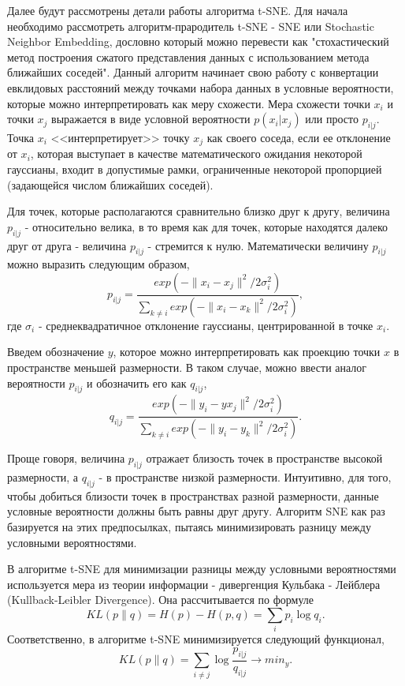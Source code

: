 \documentclass[runningheads]{llncs}
\begin{document}
Далее будут рассмотрены детали работы алгоритма t-SNE. Для начала необходимо рассмотреть алгоритм-прародитель t-SNE - SNE или Stochastic Neighbor Embedding, дословно который можно перевести как "стохастический метод построения сжатого представления данных с использованием метода ближайших соседей". Данный алгоритм начинает свою работу с конвертации евклидовых расстояний между точками набора данных в условные вероятности, которые можно интерпретировать как меру схожести. Мера схожести точки $x_i$ и точки $x_j$ выражается в виде условной вероятности $p(x_i | x_j)$ или просто $p_{i|j}$. Точка $x_i$ <<интерпретирует>> точку $x_j$ как своего соседа, если ее отклонение от $x_i$, которая выступает в качестве математического ожидания некоторой гауссианы, входит в допустимые рамки, ограниченные некоторой пропорцией (задающейся числом ближайших соседей). \par

Для точек, которые располагаются сравнительно близко друг к другу, величина $p_{i|j}$ - относительно велика, в то время как для точек, которые находятся далеко друг от друга - величина $p_{i|j}$ - стремится к нулю. Математически величину $p_{i|j}$ можно выразить следующим образом, $$p_{i|j} = \frac{exp(-\|x_i - x_j\|^2 / 2\sigma_i^2)}{\sum_{k \neq i} exp(-\|x_i - x_k\|^2 / 2\sigma_i^2)},$$
где $\sigma_i$ - среднеквадратичное отклонение гауссианы, центрированной в точке $x_i$. \par

Введем обозначение $y$, которое можно интерпретировать как проекцию точки $x$ в пространстве меньшей размерности. В таком случае, можно ввести аналог вероятности $p_{i|j}$ и обозначить его как $q_{i|j}$, $$q_{i|j} = \frac{exp(-\|y_i - yx_j\|^2 / 2\sigma_i^2)}{\sum_{k \neq i} exp(-\|y_i - y_k\|^2 / 2\sigma_i^2)}.$$

Проще говоря, величина $p_{i|j}$ отражает близость точек в пространстве высокой размерности, а $q_{i|j}$ - в пространстве низкой размерности. Интуитивно, для того, чтобы добиться близости точек в пространствах разной размерности, данные условные вероятности должны быть равны друг другу. Алгоритм SNE как раз базируется на этих предпосылках, пытаясь минимизировать разницу между условными вероятностями. \par

В алгоритме t-SNE для минимизации разницы между условными вероятностями используется мера из теории информации - дивергенция Кульбака - Лейблера (Kullback-Leibler Divergence). Она рассчитывается по формуле $$KL(p \| q) = H(p) - H(p, q) = \sum_i p_i \log{q_i}.$$ Соответственно, в алгоритме t-SNE минимизируется следующий функционал,
$$KL(p \| q) = \sum_{i\neq j} \log\frac{p_{i|j}}{q_{i|j}} \rightarrow min_y.$$
\end{document}
